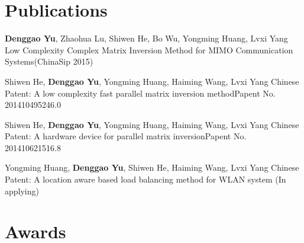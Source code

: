 \documentclass[11pt,a4paper]{moderncv}
\begin{document}



\section{Publications}
{\textbf{Denggao Yu}, \textnormal{Zhaohua Lu, Shiwen He, Bo Wu, Yongming Huang, Lvxi Yang}}
{Low Complexity Complex Matrix Inversion Method for MIMO Communication Systems}{(ChinaSip 2015)}
{}{}{}

{\textnormal{Shiwen He}, \textbf{Denggao Yu}, \textnormal{Yongming Huang, Haiming Wang, Lvxi Yang}}
{Chinese Patent: A low complexity fast parallel matrix inversion method}{Papent No. 201410495246.0}
{}{}{}

{\textnormal{Shiwen He}, \textbf{Denggao Yu}, \textnormal{Yongming Huang, Haiming Wang, Lvxi Yang}}
{Chinese Patent: A hardware device for parallel matrix inversion}{Papent No. 201410621516.8}
{}{}{}

{\textnormal{Yongming Huang}, \textbf{Denggao Yu}, \textnormal{Shiwen He, Haiming Wang, Lvxi Yang}}
{Chinese Patent: A location aware based load balancing method for WLAN system}{ (In applying)}
{}{}{}

\section{Awards}
\end{document}
